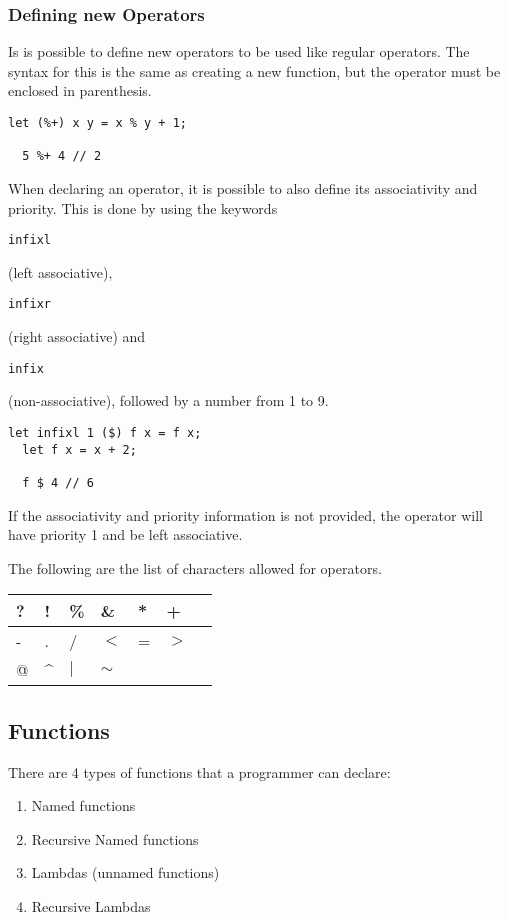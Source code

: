 \documentclass{article}
\def\code#1{\begin{footnotesize}\texttt{#1}\end{footnotesize}}
\begin{document}
\subsubsection{Defining new Operators}

Is is possible to define new operators to be used like regular operators.
The syntax for this is the same as creating a new function, but the operator must be enclosed in parenthesis.

\begin{lstlisting}[]
  let (%+) x y = x % y + 1;

  5 %+ 4 // 2
\end{lstlisting}

When declaring an operator, it is possible to also define its associativity and priority.
This is done by using the keywords \code{infixl} (left associative), \code{infixr} (right associative) and \code{infix} (non-associative), followed by a number from 1 to 9.

\begin{lstlisting}[]
  let infixl 1 ($) f x = f x;
  let f x = x + 2;

  f $ 4 // 6
\end{lstlisting}

If the associativity and priority information is not provided, the operator will have priority 1 and be left associative.

The following are the list of characters allowed for operators.

\smallskip

\begin{tabular}{|l|l|l|l|l|l|l|}
  \hline
  ? & ! & \% & \& & * & +\\
  \hline
  - & . & / & $<$ & = & $>$\\
  \hline
  @ & \textasciicircum & $|$ & $\sim$\\
  \hline
\end{tabular}

\subsection{Functions}

There are 4 types of functions that a programmer can declare:

\begin{enumerate}
  \item Named functions
  \item Recursive Named functions
  \item Lambdas (unnamed functions)
  \item Recursive Lambdas
\end{enumerate}
\end{document}
